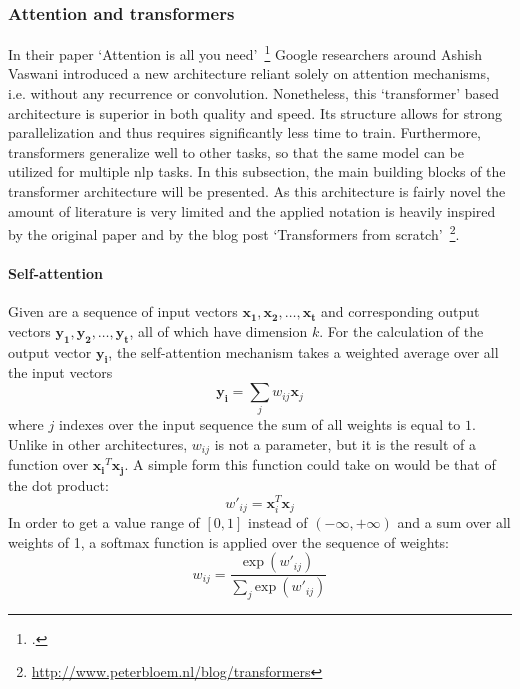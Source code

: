 \subsubsection{Attention and transformers}
\label{sub:attention_and_transformers}

In their paper `Attention is all you need'~\footcite{DBLP:journals/corr/VaswaniSPUJGKP17} Google researchers around Ashish Vaswani introduced a new architecture reliant solely on attention mechanisms, i.e. without any recurrence or convolution. Nonetheless, this `transformer' based architecture is superior in both quality and speed. Its structure allows for strong parallelization and thus requires significantly less time to train. Furthermore, transformers generalize well to other tasks, so that the same model can be utilized for multiple \gls{nlp} tasks. In this subsection, the main building blocks of the transformer architecture will be presented. As this architecture is fairly novel the amount of literature is very limited and the applied notation is heavily inspired by the original paper and by the blog post `Transformers from scratch'~\footnote{\url{http://www.peterbloem.nl/blog/transformers}}.

\paragraph{Self-attention}
Given are a sequence of input vectors $ \boldsymbol{x_1}, \boldsymbol{x_2}, \dots, \boldsymbol{x_t} $ and corresponding output vectors $ \boldsymbol{y_1}, \boldsymbol{y_2}, \dots, \boldsymbol{y_t} $, all of which have dimension $ k $. For the calculation of the output vector $ \boldsymbol{y_i} $, the self-attention mechanism takes a weighted average over all the input vectors
\begin{equation}
	\boldsymbol{y_i} = \sum_j w_{ij} \boldsymbol{x}_j
\end{equation}
where $ j $ indexes over the input sequence the sum of all weights is equal to $ 1 $. Unlike in other architectures, $ w_{ij} $ is not a parameter, but it is the result of a function over $ \boldsymbol{x_i}^T \boldsymbol{x_j} $. A simple form this function could take on would be that of the dot product:
\begin{equation}
	w'_{ij} = \boldsymbol{x}_i^T \boldsymbol{x}_j
\end{equation}
In order to get a value range of $ [0, 1] $ instead of $ (-\infty, +\infty) $ and a sum over all weights of 1, a softmax function is applied over the sequence of weights:
\begin{equation}
	w_{ij} = \frac{\text{exp} \ (w'_{ij})}{\sum_j \text{exp} \ (w'_{ij})}
\end{equation}

